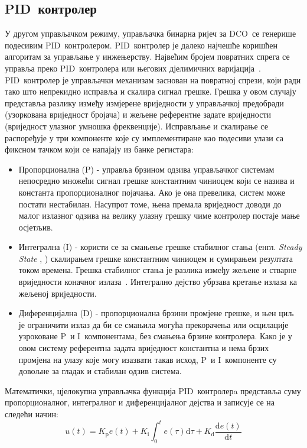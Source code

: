 \documentclass[master]{finthesis}
\makeatletter
\newcommand*{\engl}[2][\@empty]{%
    \edef\theacronym{#1}%
    (енгл. \foreignlanguage{english}{\emph{#2}%
    \ifx\theacronym\@empty \else , #1\fi})%
}
\def \DCO  {DCO} %
\def \PID  {PID} %
\def \P    {P}   %
\def \I    {I}   %
\def \D    {D}   %
\makeatother
\begin{document}
\subsection{\PID\ контролер}
У другом управљачком режиму, управљачка бинарна ријеч за \DCO\ се генерише подесивим \PID\ контролером. \PID\ контролер је далеко најчешће коришћен алгоритам за управљање у инжењерству. Највећим бројем повратних спрега се управља преко \PID\ контролера или његових дјелимичних варијација~\cite{Astrom:PID_1995}. \PID\ контролер је управљачки механизам заснован на повратној спрези, који ради тако што непрекидно исправља и скалира сигнал грешке. Грешка у овом случају представља разлику између измјерене вриједности у управљачкој предобради (узоркована вриједност бројача) и жељене референтне задате вриједности (вриједност улазног умношка фреквенције). Исправљање и скалирање се распоређује у три компоненте које су имплементиране као подесиви улази са фиксном тачком који се напајају из банке регистара: 
\begin{itemize}
	\item Пропорционална (\P) - управља брзином одзива управљачког системам непосредно множећи сигнал грешке константним чиниоцем који се назива и константа пропорционалног појачања. Ако је она превелика, систем може постати нестабилан. Насупрот томе, њена премала вриједност доводи до малог излазног одзива на велику улазну грешку чиме контролер постаје мање осјетљив. 
	\item Интегрална (\I) - користи се за смањење грешке стабилног стања \engl{Steady State} скалирањем грешке константним чиниоцем и сумирањем резултата током времена. Грешка стабилног стања је разлика између жељене и стварне вриједности коначног излаза~\cite{Liptak:PROCESS_CONTROL_2006}. Интегрално дејство убрзава кретање излаза ка жељеној вриједности.
	\item Диференцијална (\D) - пропорционална брзини промјене грешке, и њен циљ је ограничити излаз да би се смањила могућа прекорачења или осцилације узроковане \P\ и \I\ компонентама, без смањења брзине контролера. Како је у овом систему референтна задата вриједност константна и нема брзих промјена на улазу које могу изазвати такав исход, \P\ и \I\ компоненте су довољне за гладак и стабилан одзив система. \par
\end{itemize}
Математички, цјелокупна управљачка функција \PID\ контролерa представља суму пропорционалног, интегралног и диференцијалног дејства и записује се на следећи начин:
\begin{equation} 
	\label{eq_pid_1}
	u(t)= K_\text{p}e(t) + K_\text{i}\int_{0}^{t}e(\tau)\text{d}\tau + K_\text{d}\frac{\text{d}e(t)}{\text{d}t}
\end{equation}
\end{document}
